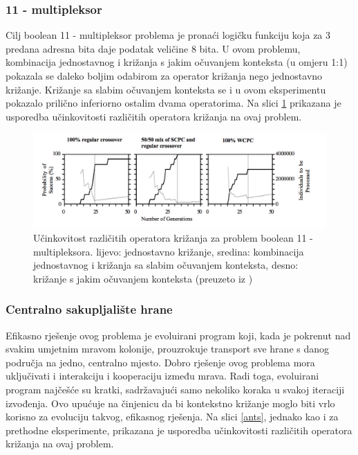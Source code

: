 \subsubsection{11 - multipleksor}
Cilj boolean 11 - multipleksor problema je pronaći logičku funkciju koja za 3 predana adresna bita daje podatak veličine 8 bita. U ovom problemu, kombinacija jednostavnog i križanja s jakim očuvanjem konteksta (u omjeru 1:1) pokazala se daleko boljim odabirom za operator križanja nego jednostavno križanje. Križanje sa slabim očuvanjem konteksta se i u ovom eksperimentu pokazalo prilično inferiorno ostalim dvama operatorima. Na slici \ref{mux} prikazana je usporedba učinkovitosti različitih operatora križanja na ovaj problem.

\begin{figure}[H]
	\centering
	\includegraphics[scale=0.4]{./slike/mux.png}
	\caption{Učinkovitost različitih operatora križanja za problem boolean 11 - multipleksora. lijevo: jednostavno križanje, sredina: kombinacija jednostavnog i križanja sa slabim očuvanjem konteksta, desno:  križanje s jakim očuvanjem konteksta (preuzeto iz \cite{crxContext})}
	\label{mux}
\end{figure}



\subsubsection{Centralno sakupljalište hrane}
Efikasno rješenje ovog problema je evoluirani program koji, kada je pokrenut nad svakim umjetnim mravom kolonije, prouzrokuje transport sve hrane s danog područja na jedno, centralno mjesto. Dobro rješenje ovog problema mora uključivati i interakciju i kooperaciju između mrava. Radi toga, evoluirani program najčešće su kratki, sadržavajući samo nekoliko koraka u svakoj iteraciji izvođenja. Ovo upućuje na činjenicu da bi kontekstno križanje moglo biti vrlo korisno za evoluciju takvog, efikasnog rješenja. Na slici \ref{ants}, jednako kao i za prethodne eksperimente, prikazana je usporedba učinkovitosti različitih operatora križanja na ovaj problem.

